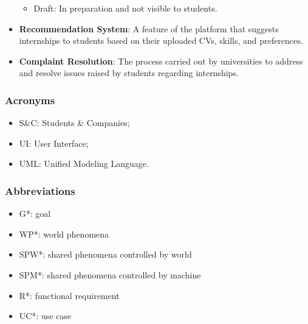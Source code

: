\begin{itemize}
\begin{itemize}
            \item Draft: In preparation and not visible to students.
        \end{itemize}
    \item \textbf{Recommendation System}: A feature of the platform that suggests internships to students based on their uploaded CVs, skills, and preferences.
    \item \textbf{Complaint Resolution}: The process carried out by universities to address and resolve issues raised by students regarding internships.

\end{itemize}

\subsubsection{Acronyms}
\begin{itemize}
    \item S\&C: Students \& Companies;
    \item UI: User Interface;
    \item UML: Unified Modeling Language.
\end{itemize}
\subsubsection{Abbreviations}
\begin{itemize}
    \item G*: goal
    \item WP*: world phenomena
    \item SPW*: shared phenomena controlled by world
    \item SPM*: shared phenomena controlled by machine
    \item R*: functional requirement
    \item UC*: use case
\end{itemize}